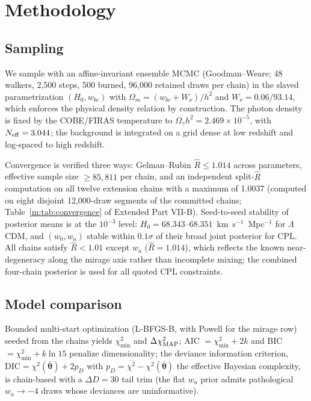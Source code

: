 \documentclass[aps,prd,preprint,superscriptaddress,nofootinbib]{revtex4-2}
\begin{document}
\section{Methodology}
\label{sec:method}

\subsection{Sampling}

We sample with an affine-invariant ensemble MCMC (Goodman--Weare; 48 walkers, 2{,}500 steps, 500 burned, 96{,}000 retained draws per chain) in the slaved parametrization $(H_0, w_{bc})$ with $\Omega_m = (w_{bc} + W_\nu)/h^2$ and $W_\nu = 0.06/93.14$, which enforces the physical density relation by construction. The photon density is fixed by the COBE/FIRAS temperature to $\Omega_\gamma h^2 = 2.469 \times 10^{-5}$, with $N_{\rm eff} = 3.044$; the background is integrated on a grid dense at low redshift and log-spaced to high redshift.

Convergence is verified three ways: Gelman--Rubin $\widehat{R} \le 1.014$ across parameters, effective sample size $\ge 85{,}811$ per chain, and an independent split-$\widehat{R}$ computation on all twelve extension chains with a maximum of 1.0037 (computed on eight disjoint 12{,}000-draw segments of the committed chains; Table~\ref{m:tab:convergence} of Extended Part VII-B). Seed-to-seed stability of posterior means is at the $10^{-3}$ level: $H_0 = 68.343$--$68.351$~km~s$^{-1}$~Mpc$^{-1}$ for $\Lambda$CDM, and $(w_0, w_a)$ stable within $0.1\sigma$ of their broad joint posterior for CPL. All chains satisfy $\widehat{R} < 1.01$ except $w_a$ ($\widehat{R} = 1.014$), which reflects the known near-degeneracy along the mirage axis rather than incomplete mixing; the combined four-chain posterior is used for all quoted CPL constraints.


\subsection{Model comparison}

Bounded multi-start optimization (L-BFGS-B, with Powell for the mirage row) seeded from the chains yields $\chi^2_{\min}$ and $\Delta\chi^2_{\rm MAP}$; AIC $= \chi^2_{\min} + 2k$ and BIC $= \chi^2_{\min} + k \ln 15$ penalize dimensionality; the deviance information criterion, $\mathrm{DIC} = \chi^2(\bar{\boldsymbol{\theta}}) + 2 p_D$ with $p_D = \overline{\chi^2} - \chi^2(\bar{\boldsymbol{\theta}})$ the effective Bayesian complexity, is chain-based with a $\Delta D = 30$ tail trim (the flat $w_a$ prior admits pathological $w_a \to -4$ draws whose deviances are uninformative).
\end{document}
